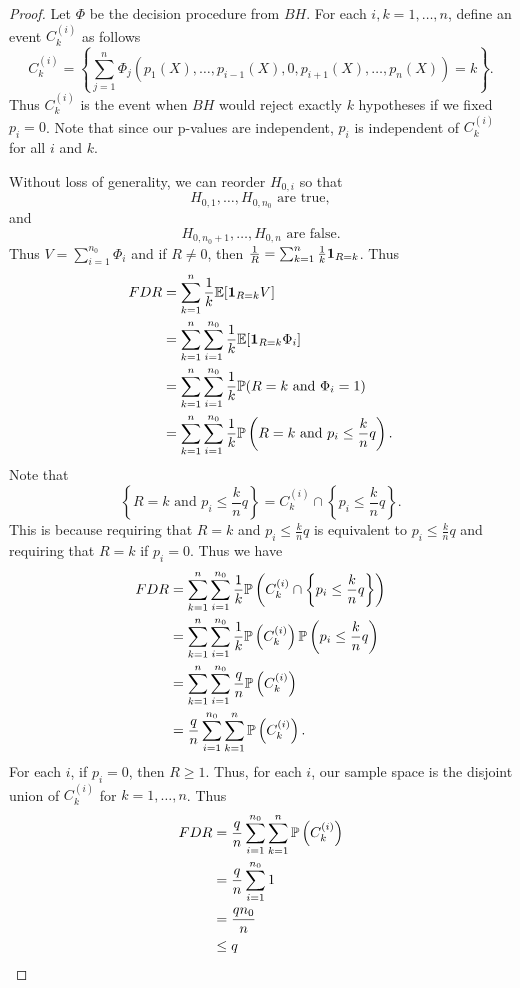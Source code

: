 \begin{proof}
    Let $\Phi$ be the decision procedure from $BH$. For each $i,k=1,\ldots,n$, define an event $C_k^{(i)}$ as follows 
    \[C_k^{(i)} = \left\{\sum_{j=1}^n \Phi_j(p_1(X),\ldots,p_{i-1}(X),0,p_{i+1}(X),\ldots,p_n(X))=k  \right\}. \]
    Thus $C_k^{(i)}$ is the event when $BH$ would reject exactly $k$ hypotheses if we fixed $p_i=0$. Note that since our p-values are independent, $p_i$ is independent of $C_k^{(i)}$ for all $i$ and $k$. 

    Without loss of generality, we can reorder $H_{0,i}$ so that 
    \[H_{0,1},\ldots,H_{0,n_0} \text{ are true}, \]
    and
    \[H_{0,n_0+1},\ldots, H_{0,n} \text{ are false.} \]
    Thus $V = \sum_{i=1}^{n_0}\Phi_i$ and if $R \neq 0$, then $\frac{1}{R}=\sum_{k=1}^n \frac{1}{k}{{\bf 1}}_{R=k}$. Thus
    \begin{align*}
        FDR &= \sum_{k=1}^n \frac{1}{k}{\mathbb{E}}[{{\bf 1}}_{R=k}V]\\
        &=\sum_{k=1}^n \sum_{i=1}^{n_0}\frac{1}{k}{\mathbb{E}}[{{\bf 1}}_{R=k}\Phi_i]\\
        &=\sum_{k=1}^n \sum_{i=1}^{n_0}\frac{1}{k} {\mathbb{P}}(R=k \text{ and } \Phi_i = 1)\\
        &=\sum_{k=1}^n \sum_{i=1}^{n_0}\frac{1}{k} {\mathbb{P}}\left(R=k \text{ and } p_i \le \frac{k}{n}q\right).
    \end{align*}
    Note that 
    \[\left\{R=k \text{ and } p_i \le \frac{k}{n}q\right\} = C_k^{(i)}\cap\left\{p_i \le \frac{k}{n}q\right\}. \]
    This is because requiring that $R=k$ and $p_i \le \frac{k}{n}q$ is equivalent to $p_i \le \frac{k}{n}q$ and requiring that $R=k$ if $p_i=0$. Thus we have
    \begin{align*}
        FDR &= \sum_{k=1}^n \sum_{i=1}^{n_0}\frac{1}{k} {\mathbb{P}}\left(C_k^{(i)}\cap\left\{p_i \le \frac{k}{n}q\right\}\right)\\
        &=\sum_{k=1}^n \sum_{i=1}^{n_0} \frac{1}{k} {\mathbb{P}}\left(C_k^{(i)}\right){\mathbb{P}}\left(p_i \le \frac{k}{n}q\right)\\
        &=\sum_{k=1}^n \sum_{i=1}^{n_0} \frac{q}{n} {\mathbb{P}}\left(C_k^{(i)}\right)\\
        &=\frac{q}{n}\sum_{i=1}^{n_0}\sum_{k=1}^n{\mathbb{P}}\left(C_k^{(i)}\right).
    \end{align*}
    For each $i$, if $p_i =0$, then $R\ge 1$. Thus, for each $i$, our sample space is the disjoint union of $C_k^{(i)}$ for $k=1,\ldots,n$. Thus
    \begin{align*}
        FDR &= \frac{q}{n}\sum_{i=1}^{n_0}\sum_{k=1}^n{\mathbb{P}}\left(C_k^{(i)}\right)\\
        &=\frac{q}{n}\sum_{i=1}^{n_0}1\\
        &=\frac{qn_0}{n}\\
        &\le q \qedhere
    \end{align*}
\end{proof}
